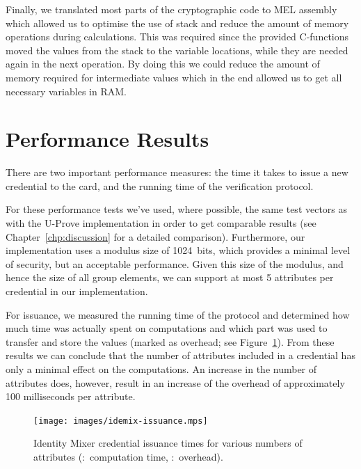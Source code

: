 Finally, we translated most parts of the cryptographic code to MEL assembly
which allowed us to optimise the use of stack and reduce the amount of memory
operations during calculations. This was required since the provided C-functions
moved the values from the stack to the variable locations, while they are needed
again in the next operation. By doing this we could reduce the amount of memory
required for intermediate values which in the end allowed us to get all
necessary variables in RAM.

\section{Performance Results\label{sec:IM-performance}}

There are two important performance measures: the time it takes to issue a new
credential to the card, and the running time of the verification protocol.

For these performance tests we've used, where possible, the same test vectors as
with the U-Prove implementation in order to get comparable results (see
Chapter~\ref{chp:discussion} for a detailed comparison). Furthermore, our
implementation uses a modulus size of 1024~bits, which provides a minimal level
of security, but an acceptable performance. Given this size of the modulus, and
hence the size of all group elements, we can support at most 5 attributes per
credential in our implementation.

For issuance, we measured the running time of the protocol and determined how
much time was actually spent on computations and which part was used to transfer
and store the values (marked as overhead; see Figure~\ref{fig:issuance}). From
these results we can conclude that the number of attributes included in a
credential has only a minimal effect on the computations. An increase in the
number of attributes does, however, result in an increase of the overhead of
approximately 100 milliseconds per attribute.

\begin{figure}[t]
  \centering
  \texttt{[image: images/idemix-issuance.mps]}

  \caption[Identity Mixer credential issuance times for various numbers of attributes.]{
    Identity Mixer credential issuance times for various numbers of attributes
    (:~computation time,
      :~overhead).}
  \label{fig:issuance}
\end{figure}

